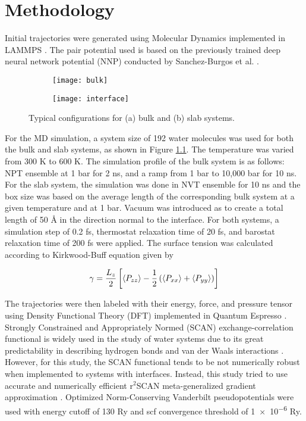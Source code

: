 \chapter{Methodology}
Initial trajectories were generated using Molecular Dynamics implemented in LAMMPS \cite{LAMMPS}. The pair potential used is based on the previously trained deep neural network potential (NNP) conducted by Sanchez-Burgos et al. \cite{sanchez2023deep}. 

\begin{figure}[tbhp]
     \centering
     \begin{subfigure}{0.4\textwidth}
         \centering
         \texttt{[image: bulk]}
         \caption{}
     \end{subfigure}
     \begin{subfigure}{0.4\textwidth}
         \centering
         \texttt{[image: interface]}
         \caption{}
     \end{subfigure}
     \hfill
        \caption{Typical configurations for (a) bulk and (b) slab systems.}
        \label{fig:cryst_sctruct}
\end{figure}

For the MD simulation, a system size of 192 water molecules was used for both the bulk and slab systems, as shown in Figure \ref{fig:cryst_sctruct}. The temperature was varied from 300 K to 600 K. The simulation profile of the bulk system is as follows: NPT ensemble at 1 bar for 2 ns, and a ramp from 1 bar to 10,000 bar for 10 ns. For the slab system, the simulation was done in NVT ensemble for 10 ns and the box size was based on the average length of the corresponding bulk system at a given temperature and at 1 bar. Vacuum was introduced as to create a total length of 50 \r{A} in the direction normal to the interface. For both systems, a simulation step of 0.2 fs, thermostat relaxation time of 20 fs, and barostat relaxation time of 200 fs were applied. The surface tension was calculated according to Kirkwood-Buff equation \cite{kirkwood1949} given by 

\begin{equation}
    \gamma = \frac{L_z}{2} \left[ \expval{P_{zz}} -\frac{1}{2} \left( \expval{P_{xx}} + \expval{P_{yy}} \right) \right]
\end{equation}

The trajectories were then labeled with their energy, force, and pressure tensor using Density Functional Theory (DFT) implemented in Quantum Espresso \cite{QE-2009,QE-2017,QE-2020}. Strongly Constrained and Appropriately Normed (SCAN) exchange-correlation functional is widely used in the study of water systems due to its great predictability in describing hydrogen bonds and van der Waals interactions \cite{sun2015strongly, chen2017ab}. However, for this study, the SCAN functional tends to be not numerically robust when implemented to systems with interfaces. Instead, this study tried to use accurate and numerically efficient r$^2$SCAN meta-generalized gradient approximation \cite{Furness2020}. Optimized Norm-Conserving Vanderbilt pseudopotentials \cite{hamann2013optimized} were used with energy cutoff of 130 Ry and scf convergence threshold of \num{1e-6} Ry.  

